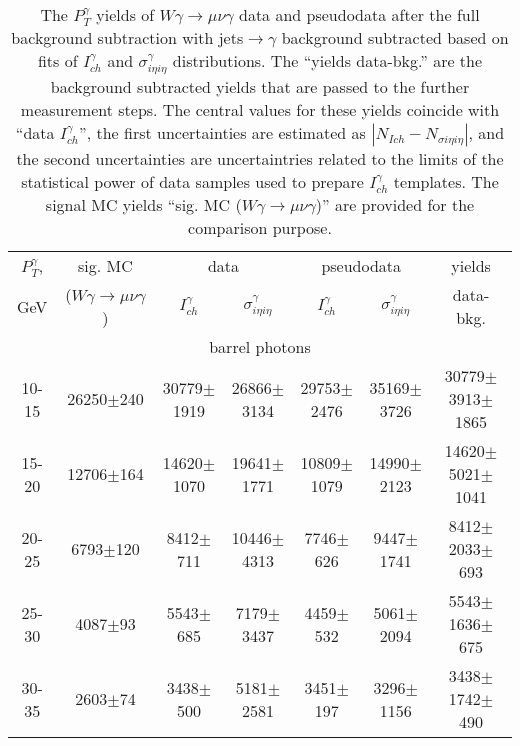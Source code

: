 \begin{table}[h]
  \tiny
  \begin{center}
  \caption{The $P_T^{\gamma}$ yields of $W\gamma\rightarrow\mu\nu\gamma$ data and pseudodata after the full background subtraction with jets$\rightarrow\gamma$ background subtracted based on fits of $I_{ch}^{\gamma}$ and  $\sigma_{i\eta i\eta}^\gamma$ distributions. The ``yields data-bkg.'' are the background subtracted yields that are passed to the further measurement steps. The central values for these yields coincide with ``data $I_{ch}^{\gamma}$'', the first uncertainties are estimated as $|N_{Ich}-N_{\sigma i\eta i\eta}|$, and the second uncertainties are uncertaintries related to the limits of the statistical power of data samples used to prepare $I_{ch}^{\gamma}$ templates. The signal MC yields ``sig. MC ($W\gamma\rightarrow\mu\nu\gamma$)'' are provided for the comparison purpose.}
  \begin{tabular}{|c|c|c|c|c|c|c|}
    \hline
    $P_T^{\gamma}$, &  sig. MC   & \multicolumn{2}{|c|}{data}  & \multicolumn{2}{|c|}{pseudodata} & yields\\ 
    GeV & ($W\gamma\rightarrow\mu\nu\gamma$) & $I_{ch}^{\gamma}$ & $\sigma_{i\eta i\eta}^\gamma$  & $I_{ch}^{\gamma}$  & $\sigma_{i\eta i\eta}^\gamma$   & data-bkg. \\ \hline
    \multicolumn{7}{|c|}{barrel photons} \\ \hline
    10-15 & 26250$\pm$240 & 30779$\pm$1919 & 26866$\pm$3134 & 29753$\pm$2476 & 35169$\pm$3726 &30779$\pm$3913$\pm$1865  \\ \hline
    15-20 & 12706$\pm$164 & 14620$\pm$1070 & 19641$\pm$1771 & 10809$\pm$1079 & 14990$\pm$2123 &14620$\pm$5021$\pm$1041  \\ \hline
    20-25 & 6793$\pm$120 & 8412$\pm$711 & 10446$\pm$4313 & 7746$\pm$626 & 9447$\pm$1741 &8412$\pm$2033$\pm$693  \\ \hline
    25-30 & 4087$\pm$93 & 5543$\pm$685 & 7179$\pm$3437 & 4459$\pm$532 & 5061$\pm$2094 &5543$\pm$1636$\pm$675  \\ \hline
    30-35 & 2603$\pm$74 & 3438$\pm$500 & 5181$\pm$2581 & 3451$\pm$197 & 3296$\pm$1156 &3438$\pm$1742$\pm$490  \\ \hline

\end{tabular}
\end{center}
\end{table}
